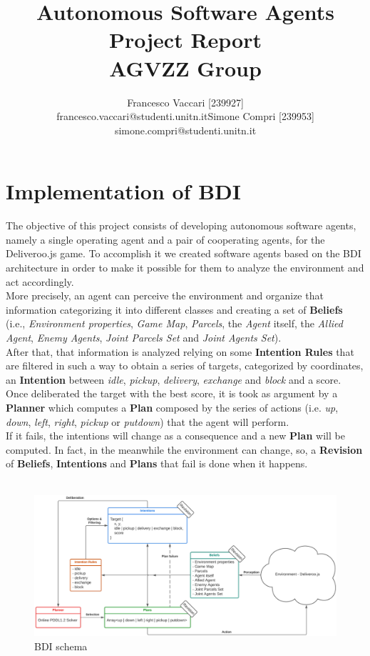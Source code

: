 \documentclass[a4paper, 11pt]{article}
\title{\Huge{Autonomous Software Agents} \\ \Large{Project Report} \\ \footnotesize{AGVZZ Group}}
\author{
\begin{tabular}{cc}
\parbox{7cm}{\centering Francesco Vaccari [239927] \\ \small{\centering francesco.vaccari@studenti.unitn.it}} & 
\parbox{7cm}{\centering Simone Compri [239953] \\ \small{\centering simone.compri@studenti.unitn.it}}
\end{tabular}
}
\date{}
\begin{document}
\maketitle
\tableofcontents


\pagebreak

\section{Implementation of BDI}

The objective of this project consists of developing autonomous software agents, namely a single operating agent and a pair of cooperating agents, for the Deliveroo.js game.
To accomplish it we created software agents based on the BDI architecture in order to make it possible for them to analyze the environment and act accordingly.\\
More precisely, an agent can perceive the environment and organize that information categorizing it into different classes and creating a set of \textbf{Beliefs} (i.e., \emph{Environment properties}, \emph{Game Map}, \emph{Parcels}, the \emph{Agent} itself, the \emph{Allied Agent}, \emph{Enemy Agents}, \emph{Joint Parcels Set} and \emph{Joint Agents Set}).\\
After that, that information is analyzed relying on some \textbf{Intention Rules} that are filtered in such a way to obtain a series of targets, categorized by coordinates, an \textbf{Intention} between \emph{idle}, \emph{pickup}, \emph{delivery}, \emph{exchange} and \emph{block} and a score.\\
Once deliberated the target with the best score, it is took as argument by a \textbf{Planner} which computes a \textbf{Plan} composed by the series of actions (i.e. \emph{up}, \emph{down}, \emph{left}, \emph{right}, \emph{pickup} or \emph{putdown}) that the agent will perform.\\
If it fails, the intentions will change as a consequence and a new \textbf{Plan} will be computed. In fact, in the meanwhile the environment can change, so, a \textbf{Revision} of \textbf{Beliefs}, \textbf{Intentions} and \textbf{Plans} that fail is done when it happens.\\
\\

\begin{figure}[h]
    \includegraphics[width=\textwidth]{images/BDI schema.png}
    \caption{BDI schema}
    \centering
\end{figure}
\end{document}
